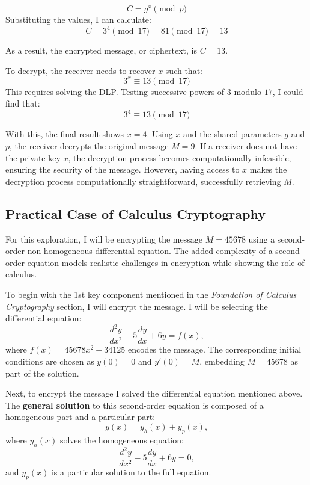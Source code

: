 \documentclass[12pt]{article}
\begin{document}
\[
C = g^x \pmod{p}
\]
\centering Substituting the values, I can calculate:
\[
C = 3^4 \pmod{17} = 81 \pmod{17} = 13
\]

As a result, the encrypted message, or ciphertext, is \( C = 13 \).

\vspace {0.1in}

To decrypt, the receiver needs to recover \( x \) such that:
\[
3^x \equiv 13 \pmod{17}
\]
This requires solving the DLP. Testing successive powers of \( 3 \) modulo \( 17 \), I could find that:
\[
3^4 \equiv 13 \pmod{17}
\]

\raggedright
\setlength{\parindent}{0.5in} %

With this, the final result shows \( x = 4 \). Using \( x \) and the shared parameters \( g \) and \( p \), the receiver decrypts the original message \( M = 9 \). If a receiver does not have the private key \( x \), the decryption process becomes computationally infeasible, ensuring the security of the message. However, having access to \( x \) makes the decryption process computationally straightforward, successfully retrieving \( M \).









\subsection*{Practical Case of Calculus Cryptography}

For this exploration, I will be encrypting the message \( M = 45678 \) using a second-order non-homogeneous differential equation. The added complexity of a second-order equation models realistic challenges in encryption while showing the role of calculus.

To begin with the 1st key component mentioned in the \textit{Foundation of Calculus Cryptography} section, I will encrypt the message. I will be selecting the differential equation:
\[
\frac{d^2y}{dx^2} - 5\frac{dy}{dx} + 6y = f(x),
\]
where \( f(x) = 45678x^2 + 34125 \) encodes the message. The corresponding initial conditions are chosen as \( y(0) = 0 \) and \( y'(0) = M \), embedding \( M = 45678 \) as part of the solution.



Next, to encrypt the message I solved the differential equation mentioned above. The \textbf{general solution} to this second-order equation is composed of a homogeneous part and a particular part:
\[
y(x) = y_h(x) + y_p(x),
\]
\centering where \( y_h(x) \) solves the homogeneous equation:
\[
\frac{d^2y}{dx^2} - 5\frac{dy}{dx} + 6y = 0,
\]
and \( y_p(x) \) is a particular solution to the full equation.
\end{document}
